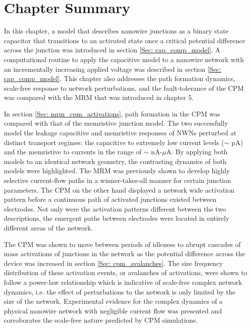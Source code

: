 \section{Chapter Summary}
\label{Sec: cpm_conclusion}

In this chapter, a model that describes nanowire junctions as a binary state capacitor that transitions to an activated state once a critical potential difference across the junction was introduced in section \ref{Sec: cap_comp_model}. A computational routine to apply the capacitive model to a nanowire network with an incrementally increasing applied voltage was described in section \ref{Sec: cap_comp_model}. This chapter also addresses the path formation dynamics, scale-free response to network perturbations, and the fault-tolerance of the CPM was compared with the MRM that was introduced in chapter 5.

In section \ref{Sec: mrm_cpm_activations}, path formation in the CPM was compared with that of the memristive junction model. The two successfully model the leakage capacitive and memristive responses of NWNs perturbed at distinct transport regimes: the capacitive to extremely low current levels ($\sim$ pA) and the memristive to currents in the range of $\sim$ nA-$\mu$A. By applying both models to an identical network geometry, the contrasting dynamics of both models were highlighted. The MRM was previously shown to develop highly selective current-flow paths in a winner-takes-all manner for certain junction parameters. The CPM on the other hand displayed a network wide activation pattern before a continuous path of activated junctions existed between electrodes. Not only were the activation patterns different between the two descriptions, the emergent paths between electrodes were located in entirely different areas of the network.
 
The CPM was shown to move between periods of idleness to abrupt cascades of mass activations of junctions in the network as the potential difference across the device was increased in section \ref{Sec: cpm_avalanches}. The size frequency distribution of these activation events, or avalanches of activations, were shown to follow a power-law relationship which is indicative of scale-free complex network dynamics, i.e. the effect of perturbations to the network is only limited by the size of the network. Experimental evidence for the complex dynamics of a physical nanowire network with negligible current flow was presented and corroborates the scale-free nature predicted by CPM simulations.

